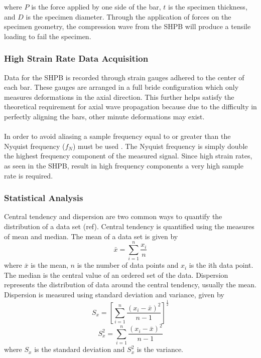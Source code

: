 \documentclass[12pt]{article}
\begin{document}
where $P$ is the force applied by one side of the bar, $t$ is the specimen thickness, and $D$ is the specimen diameter. Through the application of forces on the specimen geometry, the compression wave from the SHPB will produce a tensile loading to fail the specimen.

\subsubsection{High Strain Rate Data Acquisition} %
Data for the SHPB is recorded through strain gauges adhered to the center of each bar. These gauges are arranged in a full bride configuration which only measures deformations in the axial direction. This further helps satisfy the theoretical requirement for axial wave propagation because due to the difficulty in perfectly aligning the bars, other minute deformations may exist.
\\ \\
In order to avoid aliasing a sample frequency equal to or greater than the Nyquist frequency ($f_N$) must be used \cite{Shukla} \cite{Sampling}. The Nyquist frequency is simply double the highest frequency component of the measured signal. Since high strain rates, as seen in the SHPB, result in high frequency components a very high sample rate is required. 

\subsubsection{Statistical Analysis} %

Central tendency and dispersion are two common ways to quantify the distribution of a data set (ref). Central tendency is quantified using the measures of mean and median. The mean of a data set is given by
\begin{equation}
\bar{x} = \sum_{i=1}^{n}\frac{x_{i}}{n}
\end{equation}
where $\bar{x}$ is the mean, $n$ is the number of data points and $x_{i}$ is the ith data point. The median is the central value of an ordered set of the data. Dispersion represents the distribution of data around the central tendency, usually the mean. Dispersion is measured using standard deviation and variance, given by 
\begin{equation}
S_{x} = \left[\sum_{i=1}^{n}\frac{\left(x_{i}-\bar{x}\right)^2}{n-1}\right]^\frac{1}{2}
\end{equation}  
\begin{equation}
S_{x}^2 = \sum_{i=1}^{n}\frac{\left(x_{i}-\bar{x}\right)^2}{n-1}
\end{equation} 
where $S_{x}$ is the standard deviation and $S_{x}^2$ is the variance.
\end{document}
